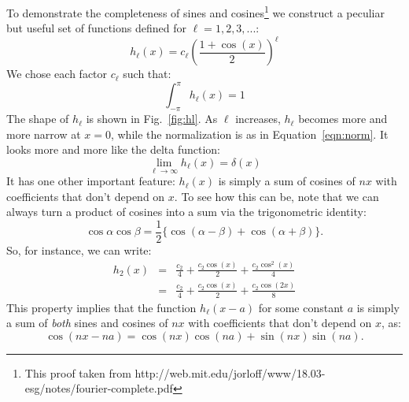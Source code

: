 \documentclass[12pt]{book}
\begin{document}
\noindent
To demonstrate the completeness of sines and cosines\footnote{This proof taken from http://web.mit.edu/jorloff/www/18.03-esg/notes/fourier-complete.pdf} we construct a peculiar but useful set of functions defined for $\ell=1,2,3,...$:
\begin{displaymath}
h_\ell(x) = c_\ell \left(\frac{1 + \cos(x)}{2}\right)^\ell
\end{displaymath}
We chose each factor $c_\ell$ such that:
\begin{displaymath}
\int_{-\pi}^{\pi} h_\ell(x) = 1
\end{displaymath}
The shape of $h_\ell$ is shown in Fig.~\ref{fig:hl}.  As $\ell$ increases, $h_\ell$ becomes more and more narrow at $x=0$, while the normalization is as in Equation~\ref{eqn:norm}.  It looks more and more like the delta function:
\begin{displaymath}
\lim_{\ell \to \infty} h_\ell(x) = \delta(x)
\end{displaymath}
It has one other important feature:  $h_\ell(x)$ is simply a sum of cosines of $nx$ with coefficients that don't depend on $x$.  To see how this can be, note that we can always turn a product of cosines into a sum via the trigonometric identity:
\begin{displaymath}
\cos \alpha \cos \beta = \frac{1}{2} \{\cos(\alpha - \beta) + \cos(\alpha + \beta)\}.
\end{displaymath}
So, for instance, we can write:
\begin{eqnarray*}
h_2(x) &=& \frac{c_2}{4} + \frac{c_2\cos(x)}{2}+\frac{c_2\cos^2(x)}{4} \\
           &=& \frac{c_2}{4} + \frac{c_2\cos(x)}{2}+\frac{c_2\cos(2x)}{8}
\end{eqnarray*}
This property implies that the function $h_\ell(x-a)$ for some constant $a$ is simply a sum of {\em both} sines and cosines of $nx$ with coefficients that don't depend on $x$, as:
\begin{displaymath}
\cos(nx-na) = \cos(nx)\cos(na) + \sin(nx)\sin(na).
\end{displaymath}
\end{document}
